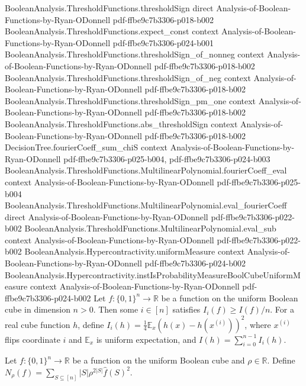 \begin{theorem}
  {BooleanAnalysis.ThresholdFunctions.thresholdSign}
  {direct}
  {Analysis-of-Boolean-Functions-by-Ryan-ODonnell}
  {pdf-ffbe9c7b3306-p018-b002}
\proofstep
  {BooleanAnalysis.ThresholdFunctions.expect_const}
  {context}
  {Analysis-of-Boolean-Functions-by-Ryan-ODonnell}
  {pdf-ffbe9c7b3306-p024-b001}
\proofstep
  {BooleanAnalysis.ThresholdFunctions.thresholdSign_of_nonneg}
  {context}
  {Analysis-of-Boolean-Functions-by-Ryan-ODonnell}
  {pdf-ffbe9c7b3306-p018-b002}
\proofstep
  {BooleanAnalysis.ThresholdFunctions.thresholdSign_of_neg}
  {context}
  {Analysis-of-Boolean-Functions-by-Ryan-ODonnell}
  {pdf-ffbe9c7b3306-p018-b002}
\proofstep
  {BooleanAnalysis.ThresholdFunctions.thresholdSign_pm_one}
  {context}
  {Analysis-of-Boolean-Functions-by-Ryan-ODonnell}
  {pdf-ffbe9c7b3306-p018-b002}
\proofstep
  {BooleanAnalysis.ThresholdFunctions.abs_thresholdSign}
  {context}
  {Analysis-of-Boolean-Functions-by-Ryan-ODonnell}
  {pdf-ffbe9c7b3306-p018-b002}
\proofstep
  {DecisionTree.fourierCoeff_sum_chiS}
  {context}
  {Analysis-of-Boolean-Functions-by-Ryan-ODonnell}
  {pdf-ffbe9c7b3306-p025-b004,
    pdf-ffbe9c7b3306-p024-b003}
\proofstep
  {BooleanAnalysis.ThresholdFunctions.MultilinearPolynomial.fourierCoeff_eval}
  {context}
  {Analysis-of-Boolean-Functions-by-Ryan-ODonnell}
  {pdf-ffbe9c7b3306-p025-b004}
\proofstep
  {BooleanAnalysis.ThresholdFunctions.MultilinearPolynomial.eval_fourierCoeff}
  {direct}
  {Analysis-of-Boolean-Functions-by-Ryan-ODonnell}
  {pdf-ffbe9c7b3306-p022-b002}
\proofstep
  {BooleanAnalysis.ThresholdFunctions.MultilinearPolynomial.eval_sub}
  {context}
  {Analysis-of-Boolean-Functions-by-Ryan-ODonnell}
  {pdf-ffbe9c7b3306-p022-b002}
\proofstep
  {BooleanAnalysis.Hypercontractivity.uniformMeasure}
  {context}
  {Analysis-of-Boolean-Functions-by-Ryan-ODonnell}
  {pdf-ffbe9c7b3306-p024-b002}
\proofstep
  {BooleanAnalysis.Hypercontractivity.instIsProbabilityMeasureBoolCubeUniformMeasure}
  {context}
  {Analysis-of-Boolean-Functions-by-Ryan-ODonnell}
  {pdf-ffbe9c7b3306-p024-b002}
\label{KKL.KKL_trivial}
Let $f:\{0,1\}^n\to\mathbb R$ be a function on the uniform Boolean cube in dimension
$n>0$. Then some $i\in[n]$ satisfies $I_i(f)\ge I(f)/n$. For a real cube function $h$,
define $I_i(h)=\tfrac14\mathbb E_x(h(x)-h(x^{(i)}))^2$, where $x^{(i)}$ flips coordinate
$i$ and $\mathbb E_x$ is uniform expectation, and $I(h)=\sum_{i=0}^{n-1}I_i(h)$.
\end{theorem}

\begin{definition}
\leanok
{}
\label{KKL.noisyTotalInfluence}
Let $f:\{0,1\}^n\to\mathbb R$ be a function on the uniform Boolean cube and $\rho\in\mathbb R$. Define $N_\rho(f)=\sum_{S\subseteq[n]}|S|\rho^{2|S|}\widehat f(S)^2$.
\end{definition}

